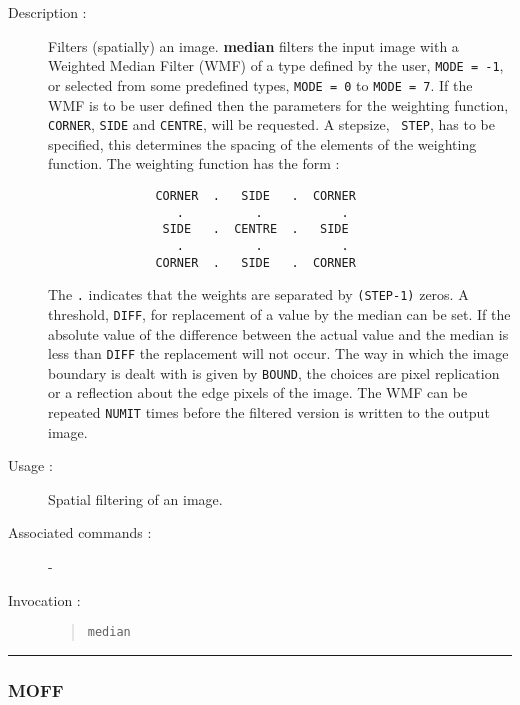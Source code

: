 \begin{description}

\item[Description :] Filters (spatially) an image.  {\bf median}
filters the input image with a Weighted Median Filter (WMF) of a type
defined by the user, {\tt MODE = -1}, or selected from some predefined
types, {\tt MODE = 0} to {\tt MODE = 7}.  If the WMF is to be user
defined then the parameters for the weighting function, {\tt CORNER},
{\tt SIDE} and {\tt CENTRE}, will be requested.  A stepsize, {\tt
STEP}, has to be specified, this determines the spacing of the elements
of the weighting function. The weighting function has the form :

\begin{small}
\begin{verbatim}
               CORNER  .   SIDE   .  CORNER
                  .          .           .
                SIDE   .  CENTRE  .   SIDE
                  .          .           .
               CORNER  .   SIDE   .  CORNER
\end{verbatim}
\end{small}

The {\tt .} indicates that the weights are separated by {\tt (STEP-1)}
zeros. A threshold, {\tt DIFF}, for replacement of a value by the
median can be set. If the absolute value of the difference between the
actual value and the median is less than {\tt DIFF} the replacement
will not occur.  The way in which the image boundary is dealt with is
given by {\tt BOUND}, the choices are pixel replication or a reflection
about the edge pixels of the image. The WMF can be repeated {\tt NUMIT}
times before the filtered version is written to the output image.

\item[Usage :] Spatial filtering of an image.
\item[Associated commands :] -
\item[Invocation :]

\begin{quote}{\tt  median }\end{quote}

\end{description}

\hrule
\subsubsection*{\label{MOFF}MOFF}

